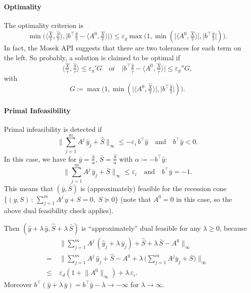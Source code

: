 \documentclass[10pt, a4paper]{article}
\newcommand{\suchthat}{\,:\,}
\newcommand{\abs}[1]{\lvert{#1}\rvert}
\newcommand{\define}{\coloneqq}
\newcommand{\norm}[1]{\lVert{#1}\rVert}
\newcommand{\skal}[2]{\langle{#1},{#2}\rangle}
\newcommand{\T}{^{\top}}
\begin{document}
\paragraph{Optimality}

The optimality criterion is
\[
\min\Big( \skal{\tfrac{\hat{X}}{\hat{\tau}}}{\tfrac{\hat{S}}{\hat{\tau}}},
\abs{b\T \tfrac{\hat{y}}{\hat{\tau}} - \skal{A^0}{\tfrac{\hat{X}}{\hat{\tau}}}}\Big)
\leq \varepsilon_g \max\Big(1,
\min(\abs{\skal{A^0}{\tfrac{\hat{X}}{\hat{\tau}}}}, \abs{b\T
  \tfrac{\hat{y}}{\hat{\tau}}})\Big).
\]
In fact, the Mosek API suggests that there are two tolerances for each term
on the left. So probably, a solution is claimed to be optimal if
\[
\skal{\tfrac{\hat{X}}{\hat{\tau}}}{\tfrac{\hat{S}}{\hat{\tau}}} \leq
\varepsilon_g' G
\quad\text{or}\quad
\abs{b\T \tfrac{\hat{y}}{\hat{\tau}} - \skal{A^0}{\tfrac{\hat{X}}{\hat{\tau}}}}
\leq \varepsilon_g'' G,
\]
with
\[
G \define \max\big(1, \min(\abs{\skal{A^0}{\tfrac{\hat{X}}{\hat{\tau}}}},
\abs{b\T \tfrac{\hat{y}}{\hat{\tau}}})\big).
\]

\paragraph{Primal Infeasibility}

Primal infeasibility is detected if
\[
\Big\lVert \sum_{j=1}^m A^j\, \hat{y}_j + \hat{S} \Big\rVert_{\infty} \leq -\varepsilon_i\, b\T \hat{y}
\quad\text{and}\quad b\T \hat{y} < 0.
\]
In this case, we have for $\bar{y} = \frac{\hat{y}}{\alpha}$, $\bar{S}
= \frac{\hat{S}}{\alpha}$ with $\alpha \define -b\T \hat{y}$:
\[
\Big\lVert \sum_{j=1}^m A^j\, \bar{y}_j + \bar{S}\Big\rVert_{\infty} \leq \varepsilon_i
\quad\text{and}\quad b\T \bar{y} = -1.
\]
This means that $(\bar{y},\bar{S})$ is (approximately) feasible for the
recession cone $\{(y,S) \suchthat \sum_{j=1}^m A^j\, y + S = 0,\; S \succeq 0\}$ (note that
$A^0 = 0$ in this case, so the above dual feasibility check applies).

Then $(\hat{y} + \lambda\, \bar{y}, \hat{S} + \lambda\, \bar{S})$ is
``approximately'' dual feasible for any $\lambda \geq 0$, because
\begin{align*}
  & \Big\lVert \sum_{j=1}^m A^j\, (\hat{y}_j + \lambda\, \bar{y}_j) + \hat{S} + \lambda\,
    \bar{S} - A^0 \Big\rVert_{\infty}\\
  =\; & \Big\lVert \sum_{j=1}^m A^j\, \hat{y}_j + \hat{S} - A^0 + \lambda\, \Big(\sum_{j=1}^m
    A^j \bar{y}_j + \bar{S}\Big)\Big\rVert_{\infty}\\
  \leq\; & \varepsilon_d (1 + \norm{A^0}_\infty) + \lambda\, \varepsilon_i.
\end{align*}
Moreover
$b\T (\hat{y} + \lambda\, \bar{y}) = b\T \hat{y} - \lambda \to -\infty$ for
$\lambda \to \infty$.
\end{document}
